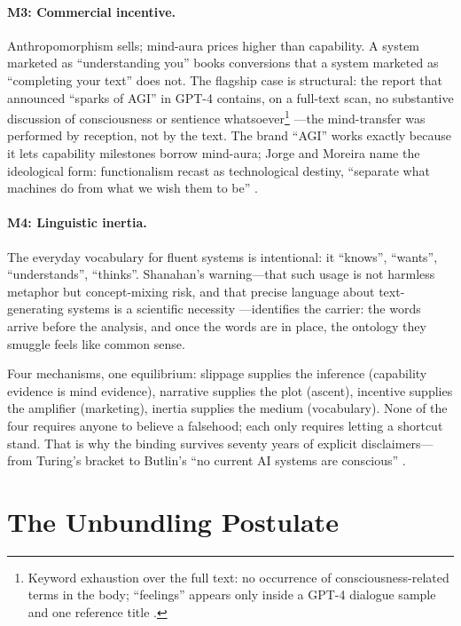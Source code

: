 \documentclass[10pt]{article}
\begin{document}
\paragraph{M3: Commercial incentive.} Anthropomorphism sells; mind-aura prices higher than capability. A system marketed as ``understanding you'' books conversions that a system marketed as ``completing your text'' does not. The flagship case is structural: the report that announced ``sparks of AGI'' in GPT-4 contains, on a full-text scan, no substantive discussion of consciousness or sentience whatsoever\footnote{Keyword exhaustion over the full text: no occurrence of consciousness-related terms in the body; ``feelings'' appears only inside a GPT-4 dialogue sample and one reference title \cite{bubeck2023sparks}.} \cite{bubeck2023sparks}---the mind-transfer was performed by reception, not by the text. The brand ``AGI'' works exactly because it lets capability milestones borrow mind-aura; Jorge and Moreira name the ideological form: functionalism recast as technological destiny, ``separate what machines do from what we wish them to be'' \cite{jorge2026harsh}.

\paragraph{M4: Linguistic inertia.} The everyday vocabulary for fluent systems is intentional: it ``knows'', ``wants'', ``understands'', ``thinks''. Shanahan's warning---that such usage is not harmless metaphor but concept-mixing risk, and that precise language about text-generating systems is a scientific necessity \cite{shanahan2024talking}---identifies the carrier: the words arrive before the analysis, and once the words are in place, the ontology they smuggle feels like common sense.

Four mechanisms, one equilibrium: slippage supplies the inference (capability evidence is mind evidence), narrative supplies the plot (ascent), incentive supplies the amplifier (marketing), inertia supplies the medium (vocabulary). None of the four requires anyone to believe a falsehood; each only requires letting a shortcut stand. That is why the binding survives seventy years of explicit disclaimers---from Turing's bracket to Butlin's ``no current AI systems are conscious'' \cite{butlin2023consciousness}.

\section{The Unbundling Postulate}\label{sec:postulate}
\end{document}
